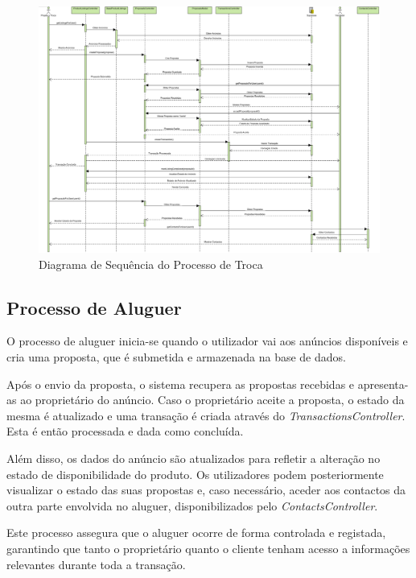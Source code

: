 \documentclass[a4paper, 12pt]{article} %
\begin{document}
\begin{figure}[ht]
	\centering
	\includegraphics[width=\textwidth]{../images/sequence-diagram-swap.png}
	\caption{Diagrama de Sequência do Processo de Troca}
	\label{fig:diagrama_sequencia_troca}
\end{figure}

\subsection{Processo de Aluguer}
O processo de aluguer inicia-se quando o utilizador vai aos anúncios disponíveis e cria uma proposta, que é submetida e armazenada na base de dados.

Após o envio da proposta, o sistema recupera as propostas recebidas e apresenta-as ao proprietário do anúncio. Caso o proprietário aceite a proposta, o estado da mesma é atualizado e uma transação é criada através do \textit{TransactionsController}. Esta é então processada e dada como concluída.

Além disso, os dados do anúncio são atualizados para refletir a alteração no estado de disponibilidade do produto. Os utilizadores podem posteriormente visualizar o estado das suas propostas e, caso necessário, aceder aos contactos da outra parte envolvida no aluguer, disponibilizados pelo \textit{ContactsController}.

Este processo assegura que o aluguer ocorre de forma controlada e registada, garantindo que tanto o proprietário quanto o cliente tenham acesso a informações relevantes durante toda a transação.
\end{document}
